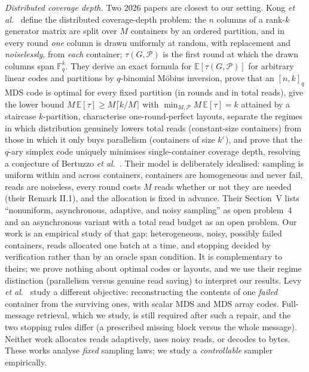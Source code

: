 \documentclass[conference,onecolumn,11pt]{IEEEtran}
\newcommand{\E}{\mathbb{E}}
\begin{document}
\emph{Distributed coverage depth.}  Two 2026 papers are closest to our setting.  Kong \emph{et al.}~\cite{kong2026coverage} define the distributed coverage-depth
problem: the $n$ columns of a rank-$k$ generator matrix are split over $M$ containers by an ordered
partition, and in every round \emph{one} column is drawn uniformly at random, with replacement and
\emph{noiselessly}, from \emph{each} container; $\tau(G,\mathcal P)$ is the first round at which the
drawn columns span $\mathbb F_q^k$.  They derive an exact formula for $\E[\tau(G,\mathcal P)]$ for
arbitrary linear codes and partitions by $q$-binomial M\"obius inversion, prove that an $[n,k]_q$ MDS
code is optimal for every fixed partition (in rounds and in total reads), give the lower bound
$M\,\E[\tau]\ge M\lceil k/M\rceil$ with $\min_{M,\mathcal P}M\,\E[\tau]=k$ attained by a staircase
$k$-partition, characterise one-round-perfect layouts, separate the regimes in which distribution
genuinely lowers total reads (constant-size containers) from those in which it only buys parallelism
(containers of size $k^\varepsilon$), and prove that the $q$-ary simplex code uniquely minimises
single-container coverage depth, resolving a conjecture of Bertuzzo \emph{et al.}~\cite{bertuzzo2025coverage}.
Their model is deliberately idealised: sampling is uniform within and across containers, containers are
homogeneous and never fail, reads are noiseless, every round costs $M$ reads whether or not they are
needed (their Remark II.1), and the allocation is fixed in advance.  Their Section~V lists
``nonuniform, asynchronous, adaptive, and noisy sampling'' as open problem~4 and an asynchronous
variant with a total read budget as an open problem.  Our work is an empirical study of that gap:
heterogeneous, noisy, possibly failed containers, reads allocated one batch at a time, and stopping
decided by verification rather than by an oracle span condition.  It is complementary to theirs; we
prove nothing about optimal codes or layouts, and we use their regime distinction (parallelism versus
genuine read saving) to interpret our results.  Levy
\emph{et al.}~\cite{levy2026expected} study a different objective: reconstructing the contents of one
\emph{failed} container from the surviving ones, with scalar MDS and MDS array codes.  Full-message
retrieval, which we study, is still required after such a repair, and the two stopping rules differ
(a prescribed missing block versus the whole message).  Neither work allocates reads adaptively, uses
noisy reads, or decodes to bytes.  These works analyse \emph{fixed} sampling laws; we study a
\emph{controllable} sampler empirically.
\end{document}
